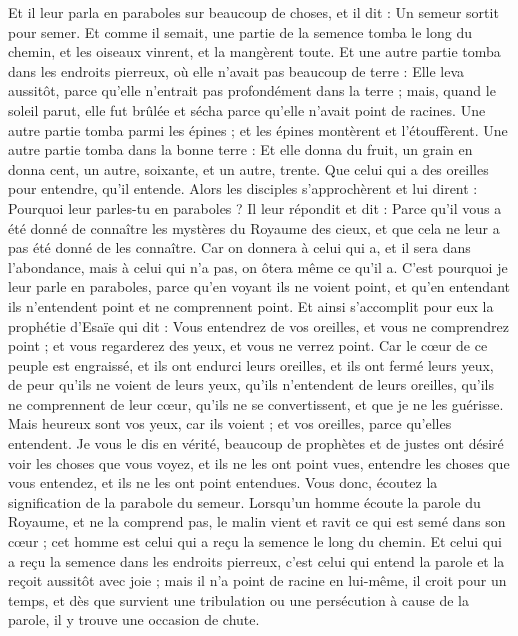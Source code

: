 \begin{multicols}{2}
Et il leur parla en paraboles sur beaucoup de choses, et il dit : Un semeur sortit pour semer.
Et comme il semait, une partie de la semence tomba le long du chemin, et les oiseaux vinrent, et la mangèrent toute.
Et une autre partie tomba dans les endroits pierreux, où elle n'avait pas beaucoup de terre : Elle leva aussitôt, parce qu'elle n'entrait pas profondément dans la terre ;
mais, quand le soleil parut, elle fut brûlée et sécha parce qu'elle n'avait point de racines.
Une autre partie tomba parmi les épines ; et les épines montèrent et l'étouffèrent.
Une autre partie tomba dans la bonne terre : Et elle donna du fruit, un grain en donna cent, un autre, soixante, et un autre, trente.
Que celui qui a des oreilles pour entendre, qu'il entende.
Alors les disciples s'approchèrent et lui dirent : Pourquoi leur parles-tu en paraboles ?
Il leur répondit et dit : Parce qu'il vous a été donné de connaître les mystères du Royaume des cieux, et que cela ne leur a pas été donné de les connaître.
Car on donnera à celui qui a, et il sera dans l'abondance, mais à celui qui n'a pas, on ôtera même ce qu'il a.
C'est pourquoi je leur parle en paraboles, parce qu'en voyant ils ne voient point, et qu'en entendant ils n'entendent point et ne comprennent point.
Et ainsi s'accomplit pour eux la prophétie d'Esaïe qui dit : Vous entendrez de vos oreilles, et vous ne comprendrez point ; et vous regarderez des yeux, et vous ne verrez point.
Car le cœur de ce peuple est engraissé, et ils ont endurci leurs oreilles, et ils ont fermé leurs yeux, de peur qu'ils ne voient de leurs yeux, qu'ils n'entendent de leurs oreilles, qu'ils ne comprennent de leur cœur, qu'ils ne se convertissent, et que je ne les guérisse.
Mais heureux sont vos yeux, car ils voient ; et vos oreilles, parce qu'elles entendent.
Je vous le dis en vérité, beaucoup de prophètes et de justes ont désiré voir les choses que vous voyez, et ils ne les ont point vues, entendre les choses que vous entendez, et ils ne les ont point entendues.
Vous donc, écoutez la signification de la parabole du semeur.
Lorsqu'un homme écoute la parole du Royaume, et ne la comprend pas, le malin vient et ravit ce qui est semé dans son cœur ; cet homme est celui qui a reçu la semence le long du chemin.
Et celui qui a reçu la semence dans les endroits pierreux, c'est celui qui entend la parole et la reçoit aussitôt avec joie ;
mais il n'a point de racine en lui-même, il croit pour un temps, et dès que survient une tribulation ou une persécution à cause de la parole, il y trouve une occasion de chute.

\end{multicols}
